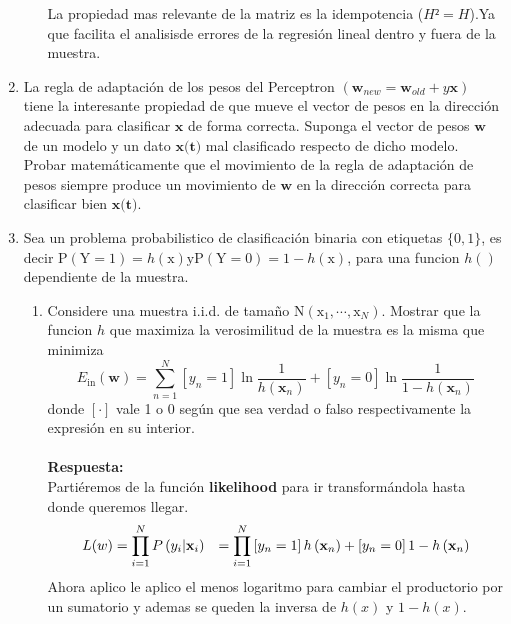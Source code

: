 \documentclass[12pt,a4paper]{article}
\begin{document}
\begin{enumerate}
\begin{enumerate}
		La propiedad mas relevante de la matriz es la idempotencia ($H²=H$).Ya que facilita el analisisde errores de la regresión lineal dentro y fuera de la muestra.\cite{Abu-Mostafa:2012:LD:2207825}
	\end{enumerate}
	\item  La regla de adaptación de los pesos del Perceptron $\left(\mathbf{w}_{n e w}=\mathbf{w}_{o l d}+y \mathbf{x}\right)$ tiene la interesante propiedad de que mueve el vector de pesos en la dirección adecuada para clasificar $\textbf{x}$ de
	forma correcta. Suponga el vector de pesos $\textbf{w}$ de un modelo y un dato $\textbf{x(t)}$ mal clasificado
	respecto de dicho modelo. Probar matemáticamente que el movimiento de la regla de
	adaptación de pesos siempre produce un movimiento de $\textbf{w}$ en la dirección correcta para
	clasificar bien $\textbf{x(t)}$.
	\item Sea un problema probabilistico de clasificación binaria con etiquetas $\{0,1\}$, es decir $\mathrm{P}(\mathrm{Y}=1)=h(\mathrm{x}) \mathrm{y} \mathrm{P}(\mathrm{Y}=0)=1-h(\mathrm{x})$, para una funcion $h()$ dependiente de la muestra.
	\begin{enumerate}
		\item  Considere  una muestra i.i.d. de tamaño $\mathrm{N}\left(\mathrm{x}_{1}, \cdots, \mathrm{x}_{N}\right)$. Mostrar que la funcion $h$ que maximiza la verosimilitud de la muestra es la misma que minimiza
		$$E_{\mathrm{in}}(\mathbf{w})=\sum_{n=1}^{N}\left[y_{n}=1\right] \ln \frac{1}{h\left(\mathbf{x}_{n}\right)}+\left[y_{n}=0\right] \ln \frac{1}{1-h\left(\mathbf{x}_{n}\right)}$$ donde $[\cdot]$ vale 1 o 0 según que sea verdad o falso respectivamente la expresión en su interior.\\\\\textbf{Respuesta: }\\
		Partiéremos de la función \textbf{likelihood} para ir transformándola hasta donde queremos llegar.
		\begin{equation}
		\begin{aligned}
		\begin{split}
		\notag
			L(w) &=\prod_{i=1}^{N} P\left(y_{i} | \mathbf{x}_{i}\right) &= \prod_{i=1}^{N} \left[y_{n}=1\right] h\left(\mathbf{x}_{n}\right)+ \left[y_{n}=0\right] 1-h\left(\mathbf{x}_{n}\right)
		\end{split}
		\end{aligned}
		\end{equation}
		Ahora aplico le aplico el menos logaritmo para cambiar el productorio por un sumatorio y ademas se queden la inversa de $h(x)$ y $1-h(x)$.

\end{enumerate}
\end{enumerate}
\end{document}

